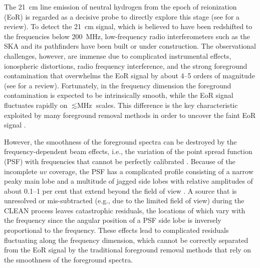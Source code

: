\documentclass[fleqn,usenatbib]{mnras}
\begin{document}
The \SI{21}{\cm} line emission of neutral hydrogen from the epoch of
reionization (EoR) is regarded as a decisive probe to directly explore
this stage (see \citealt{furlanetto2016rev} for a review).
To detect the \SI{21}{\cm} signal, which is believed to have been
redshifted to the frequencies below \SI{200}{\MHz}, low-frequency
radio interferometers such as the SKA \citep{koopmans2015rev} and its
pathfinders have been built or under construction.
The observational challenges, however, are immense due to
complicated instrumental effects, ionospheric distortions, radio frequency
interference, and the strong foreground contamination that
overwhelms the EoR signal by about \numrange{4}{5} orders of magnitude
(see \citealt{morales2010rev} for a review).
Fortunately, in the frequency dimension the foreground contamination
is expected to be intrinsically smooth, while the EoR signal fluctuates
rapidly on $\lesssim \si{\MHz}$ scales.
This difference is the key characteristic exploited by many
foreground removal methods in order to uncover the faint EoR signal
\citep[e.g.,][]{wang2006,liu2009fgrm,harker2009,wang2013,gu2013}.

However, the smoothness of the foreground spectra can be destroyed by
the frequency-dependent beam effects, i.e., the variation of the point
spread function (PSF) with frequencies that cannot be perfectly
calibrated \citep{liu2009ps}.
Because of the incomplete $uv$ coverage,
the PSF has a complicated profile consisting of a narrow peaky main lobe
and a multitude of jagged side lobes with relative amplitudes of about
\numrange{0.1}{1} per cent that extend beyond the field of view
\citep[e.g.,][their figures 1 and 3]{liu2009ps}.
A source that is unresolved or mis-subtracted (e.g., due to the limited
field of view) during the CLEAN process leaves catastrophic residuals,
the locations of which vary with the frequency since the angular
position of a PSF side lobe is inversely proportional to the frequency.
These effects lead to complicated residuals fluctuating along the
frequency dimension, which cannot be correctly separated from the EoR
signal by the traditional foreground removal methods that rely on
the smoothness of the foreground spectra.
\end{document}
